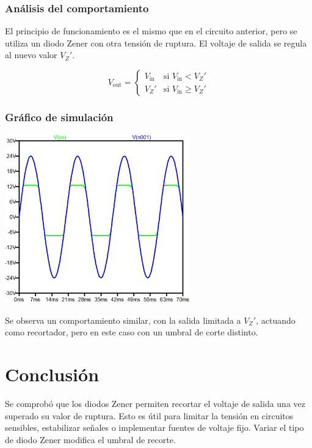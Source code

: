 \documentclass[chaptersright]{informeutn}
\begin{document}
\subsubsection*{Análisis del comportamiento}

El principio de funcionamiento es el mismo que en el circuito anterior, pero se utiliza un diodo Zener con otra tensión de ruptura. El voltaje de salida se regula al nuevo valor \( V_Z' \).

\[
V_{\text{out}} =
\begin{cases}
    V_{\text{in}} & \text{si } V_{\text{in}} < V_Z' \\
    V_Z' & \text{si } V_{\text{in}} \geq V_Z'
\end{cases}
\]

\subsubsection*{Gráfico de simulación}
\begin{center}
    \includegraphics[width=0.6\textwidth]{pictures/zener_2_grafico.jpeg}
\end{center}

\noindent
Se observa un comportamiento similar, con la salida limitada a \( V_Z' \), actuando como recortador, pero en este caso con un umbral de corte distinto.

\section*{Conclusión}

Se comprobó que los diodos Zener permiten recortar el voltaje de salida una vez superado su valor de ruptura. Esto es útil para limitar la tensión en circuitos sensibles, estabilizar señales o implementar fuentes de voltaje fijo. Variar el tipo de diodo Zener modifica el umbral de recorte.
\end{document}
